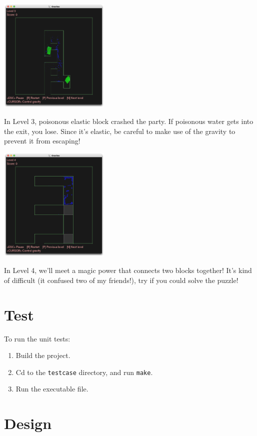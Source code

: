 \documentclass{article}
\begin{document}
\begin{center}
    \includegraphics[width=200px]{Level3.png}
    \end{center}
In Level 3, poisonous elastic block crashed the party.
If poisonous water gets into the exit, you lose.
Since it's elastic, be careful to make use of the gravity to prevent it from escaping!

\begin{center}
    \includegraphics[width=200px]{Level4.png}
    \end{center}
In Level 4, we'll meet a magic power that connects two blocks together!
It's kind of difficult (it confused two of my friends!), try if you could solve the puzzle!

\section{Test}
To run the unit tests:
\begin{enumerate}
    \item Build the project.
    \item Cd to the \verb|testcase| directory, and run \verb|make|.
    \item Run the executable file.
\end{enumerate}

\section{Design}
\end{document}
